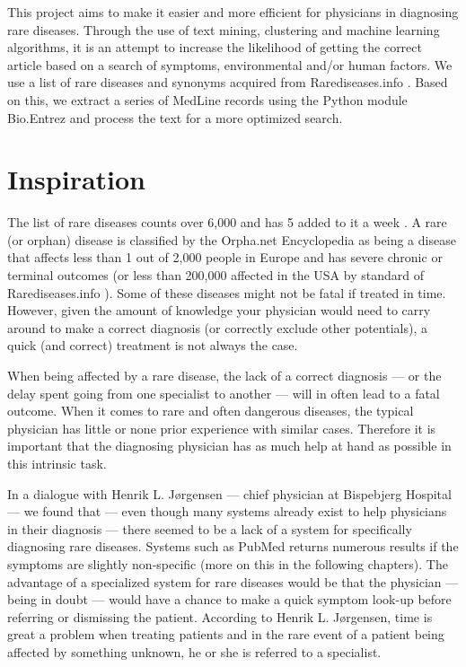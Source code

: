 This project aims to make it easier and more efficient for physicians
in diagnosing rare diseases. Through the use of text mining,
clustering and machine learning algorithms, it is an attempt to
increase the likelihood of getting the correct article based on a
search of symptoms, environmental and/or human factors. We use a list
of rare diseases and synonyms acquired from Rarediseases.info
\cite{Rarediseases}. Based on this, we
extract a series of MedLine records \cite{PubMedFactSheetMedline}
using the Python module Bio.Entrez \cite{EntrezProgUtil} and process
the text for a more optimized search.

\section{Inspiration}

The list of rare diseases counts over 6,000 and has 5
added to it a week \cite{AboutRareDiseasesOrphanet}. A rare (or
orphan) disease is classified by the Orpha.net Encyclopedia
\cite{OrphanetEncyclopedia} as being a disease that affects less than
1 out of 2,000 people in Europe and has severe chronic or terminal
outcomes (or less than 200,000 affected in the USA by standard of
Rarediseases.info \cite{Rarediseases}). Some of these  diseases might not be fatal if treated in
time. However, given the amount of knowledge your physician would need
to carry around to make a correct diagnosis (or correctly exclude
other potentials), a quick (and correct) treatment is not always the
case.

When being affected by a rare disease, the lack of a correct diagnosis
--- or the delay spent going from one specialist to another --- will in
often lead to a fatal outcome. When it comes to rare and often
dangerous diseases, the typical physician has little or none prior
experience with similar cases. Therefore it is important that the
diagnosing physician has as much help at hand as possible in this
intrinsic task.

In a dialogue with Henrik L. J\o rgensen \cite{TheDude} --- chief
physician at Bispebjerg Hospital --- we found that --- even though
many systems already exist to help physicians in their diagnosis ---
there seemed to be a lack of a system for specifically diagnosing rare
diseases. Systems such as PubMed returns numerous results if the
symptoms are slightly non-specific (more on this in the following
chapters). The advantage of a specialized system for rare diseases
would be that the physician --- being in doubt --- would have a chance
to make a quick symptom look-up before referring or dismissing the
patient. According to Henrik L. J\o rgensen, time is great a problem
when treating patients and in the rare event of a patient being
affected by something unknown, he or she is referred to a specialist.

